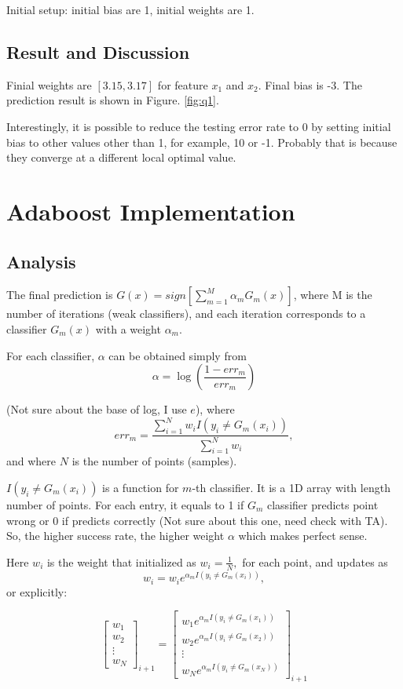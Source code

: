 \documentclass[11pt]{article}
\begin{document}
Initial setup: initial bias are 1, initial weights are 1.


\subsection{Result and Discussion}
Finial weights are $[3.15, 3.17]$ for feature $x_1$ and $x_2$. Final bias is -3. The prediction result is shown in Figure. \ref{fig:q1}.

Interestingly, it is possible to reduce the testing error rate to 0 by setting initial bias to other values other than 1, for example, 10 or -1. Probably that is because they converge at a different local optimal value.

\clearpage

\section{Adaboost Implementation}

\subsection{Analysis}
The final prediction is $G(x)= sign[\sum_{m=1}^M \alpha_m G_m(x) ]$, where M is the number of iterations (weak classifiers), and each iteration corresponds to a classifier $G_m(x)$ with a weight $\alpha_m$. 


For each classifier, $\alpha$ can be obtained simply from 
$$\alpha = \log(\frac{1-err_m}{err_m})$$

 (Not sure about the base of log, I use $e$), where $$err_m = \frac{\sum_{i=1}^N w_i I(y_i\neq G_m(x_i))}{\sum_{i=1}^{N}w_i},$$ and where $N$ is the number of points (samples).
 
 $I(y_i\neq G_m(x_i))$ is a function for $m$-th classifier. It is a 1D array with length number of points. For each entry, it equals to 1 if $G_m$ classifier predicts point wrong or 0 if predicts correctly (Not sure about this one, need check with TA). So, the higher success rate, the higher weight $\alpha$ which makes perfect sense. 
 
 
Here $w_i$ is the weight that initialized as $w_i = \frac{1}{N},$ for each point, and updates as $$w_i = w_ie^{\alpha_mI(y_i\neq G_m(x_i))},$$ or explicitly:

\[
\begin{bmatrix}
w_1 \\
w_2 \\
\vdots \\
w_N  
\end{bmatrix}_{i+1}
=
\begin{bmatrix}
w_1 e^{\alpha_mI(y_i\neq G_m(x_1))} \\
w_2 e^{\alpha_mI(y_i\neq G_m(x_2))} \\
\vdots \\
w_N e^{\alpha_mI(y_i\neq G_m(x_N))}
\end{bmatrix}_{i+1}
\]
\end{document}
